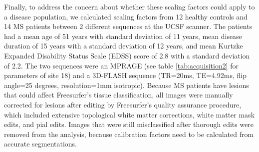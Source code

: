 Finally, to address the concern about whether these scaling factors could apply to a disease population, we calculated scaling factors from 12 healthy controls and 14 MS patients between 2 different sequences at the UCSF scanner. The patients had a mean age of 51 years with standard deviation of 11 years, mean disease duration of 15 years with a standard deviation of 12 years, and mean Kurtzke Expanded Disability Status Scale (EDSS) \cite{Kurtzke_1983} score of 2.8 with a standard deviation of 2.2. The two sequences were an MPRAGE (see table \ref{tab:acquisition2} for parameters of site 18) and a 3D-FLASH sequence (TR=20ms, TE=4.92ms, flip angle=25 degrees, resolution=1mm isotropic). Because MS patients have lesions that could affect Freesurfer's tissue classification, all images were manually corrected for lesions after editing by Freesurfer's quality assurance procedure, which included extensive topological white matter corrections, white matter mask edits, and pial edits. Images that were still misclassified after thorough edits were removed from the analysis, because calibration factors need to be calculated from accurate segmentations.